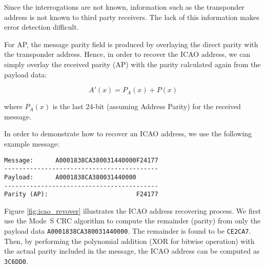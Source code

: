 Since the interrogations are not known, information such as the transponder address is not known to third party receivers. The lack of this information makes error detection difficult.

For AP, the message parity field is produced by overlaying the direct parity with the transponder address. Hence, in order to recover the ICAO address, we can simply overlay the received parity (AP) with the parity calculated again from the payload data:

\begin{equation}
  A'(x) = P_A(x) + P(x)
\end{equation}

\noindent where $P_A(x)$ is the last 24-bit (assuming Address Parity) for the received message.

In order to demonstrate how to recover an ICAO address, we use the following example message:

\begin{verbatim}
Message:      A0001838CA380031440000F24177
------------------------------------------
Payload:      A0001838CA380031440000
------------------------------------------
Parity (AP):                        F24177
\end{verbatim}

Figure \ref{fig:icao_revover} illustrates the ICAO address recovering process. We first use the Mode~S CRC algorithm to compute the remainder (parity) from only the payload data \texttt{A0001838CA380031440000}. The remainder is found to be \texttt{CE2CA7}. Then, by performing the polynomial addition (XOR for bitwise operation) with the actual parity included in the message, the ICAO address can be computed as \texttt{3C6DD0}.

